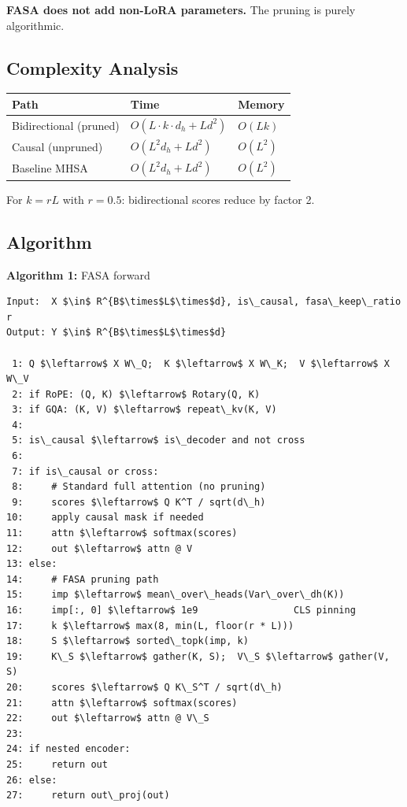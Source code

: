 \textbf{FASA does not add non-LoRA parameters.} The pruning is purely 
algorithmic.

\subsection{Complexity Analysis}

\begin{table}[H]
\centering
\small
\begin{tabular}{lll}
\toprule
\textbf{Path} & \textbf{Time} & \textbf{Memory} \\
\midrule
Bidirectional (pruned) & $O(L \cdot k \cdot d_h + L d^2)$ & $O(L k)$ \\
Causal (unpruned) & $O(L^2 d_h + L d^2)$ & $O(L^2)$ \\
Baseline MHSA & $O(L^2 d_h + L d^2)$ & $O(L^2)$ \\
\bottomrule
\end{tabular}
\end{table}

For $k = rL$ with $r = 0.5$: bidirectional scores reduce by factor 2.

\subsection{Algorithm}

\textbf{Algorithm 1:} FASA forward
\begin{lstlisting}
Input:  X $\in$ R^{B$\times$L$\times$d}, is\_causal, fasa\_keep\_ratio r
Output: Y $\in$ R^{B$\times$L$\times$d}

 1: Q $\leftarrow$ X W\_Q;  K $\leftarrow$ X W\_K;  V $\leftarrow$ X W\_V
 2: if RoPE: (Q, K) $\leftarrow$ Rotary(Q, K)
 3: if GQA: (K, V) $\leftarrow$ repeat\_kv(K, V)
 4:
 5: is\_causal $\leftarrow$ is\_decoder and not cross
 6:
 7: if is\_causal or cross:
 8:     # Standard full attention (no pruning)
 9:     scores $\leftarrow$ Q K^T / sqrt(d\_h)
10:     apply causal mask if needed
11:     attn $\leftarrow$ softmax(scores)
12:     out $\leftarrow$ attn @ V
13: else:
14:     # FASA pruning path
15:     imp $\leftarrow$ mean\_over\_heads(Var\_over\_dh(K))
16:     imp[:, 0] $\leftarrow$ 1e9                 CLS pinning
17:     k $\leftarrow$ max(8, min(L, floor(r * L)))
18:     S $\leftarrow$ sorted\_topk(imp, k)
19:     K\_S $\leftarrow$ gather(K, S);  V\_S $\leftarrow$ gather(V, S)
20:     scores $\leftarrow$ Q K\_S^T / sqrt(d\_h)
21:     attn $\leftarrow$ softmax(scores)
22:     out $\leftarrow$ attn @ V\_S
23:
24: if nested encoder:
25:     return out
26: else:
27:     return out\_proj(out)
\end{lstlisting}

